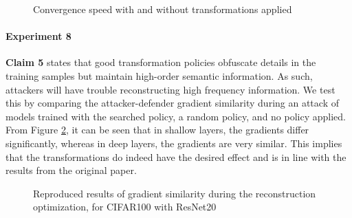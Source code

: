 \begin{figure}[h]
    \centering
    \caption{Convergence speed with and without transformations applied}
    \label{fig:3}
    \vspace{-6mm}
\end{figure}
\paragraph{Experiment 8}

\textbf{Claim 5} states that good transformation policies obfuscate details in the training samples but maintain high-order semantic information. As such, attackers will have trouble reconstructing high frequency information. We test this by comparing the attacker-defender gradient similarity during an attack of models trained with the searched policy, a random policy, and no policy applied. From Figure \ref{fig:6}, it can be seen that in shallow layers, the gradients differ significantly, whereas in deep layers, the gradients are very similar. This implies that the transformations do indeed have the desired effect and is in line with the results from the original paper.

\begin{figure}[htb]
    \centering
    \hspace{5mm}
    \caption{Reproduced results of gradient similarity during the reconstruction optimization, for CIFAR100 with ResNet20}
    \label{fig:6}
    \vspace{-5mm}
\end{figure}

